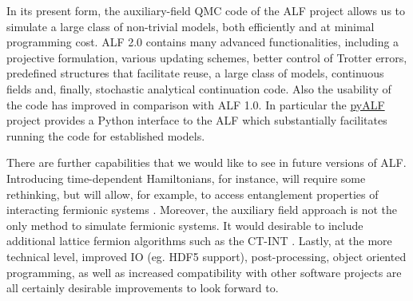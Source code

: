 
In its present form, the  auxiliary-field QMC code of the ALF project allows us to simulate a large class of non-trivial models, both efficiently and at minimal  programming cost.  ALF 2.0 contains many advanced functionalities, including a projective formulation, various updating schemes, better control of Trotter errors, predefined structures that facilitate reuse, a large class of models, continuous fields and, finally, stochastic analytical continuation code. Also the usability of the code has improved in comparison with ALF 1.0. In particular the \href{https://git.physik.uni-wuerzburg.de/ALF/pyALF}{pyALF} project provides a Python interface to the ALF which substantially facilitates running the code for established models.

There are further capabilities that we would like to see in future versions of ALF. Introducing time-dependent Hamiltonians, for instance, will require some rethinking, but will allow, for example, to access entanglement properties of interacting fermionic systems \cite{Broecker14,Assaad14,Assaad13a,Assaad15}. Moreover, the auxiliary field approach is not the only method to simulate fermionic systems.  It would desirable to include additional lattice fermion algorithms such as the CT-INT \cite{Rubtsov05,Assaad07}. Lastly, at the more technical level, improved IO (eg. HDF5 support), post-processing, object oriented programming, as well as increased compatibility with other software projects are all certainly desirable improvements to look forward to. 
